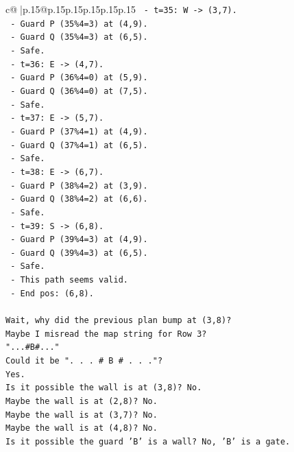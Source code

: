 \documentclass{article}
\begin{document}
{\begin{supertabular}{c@{$\;$}|p{.15\linewidth}@{}p{.15\linewidth}p{.15\linewidth}p{.15\linewidth}p{.15\linewidth}p{.15\linewidth}}
{{{\texttt{  {-} t=35: W {-}> (3,7).} \\
\texttt{    {-} Guard P (35\%4=3) at (4,9).} \\
\texttt{    {-} Guard Q (35\%4=3) at (6,5).} \\
\texttt{    {-} Safe.} \\
\texttt{  {-} t=36: E {-}> (4,7).} \\
\texttt{    {-} Guard P (36\%4=0) at (5,9).} \\
\texttt{    {-} Guard Q (36\%4=0) at (7,5).} \\
\texttt{    {-} Safe.} \\
\texttt{  {-} t=37: E {-}> (5,7).} \\
\texttt{    {-} Guard P (37\%4=1) at (4,9).} \\
\texttt{    {-} Guard Q (37\%4=1) at (6,5).} \\
\texttt{    {-} Safe.} \\
\texttt{  {-} t=38: E {-}> (6,7).} \\
\texttt{    {-} Guard P (38\%4=2) at (3,9).} \\
\texttt{    {-} Guard Q (38\%4=2) at (6,6).} \\
\texttt{    {-} Safe.} \\
\texttt{  {-} t=39: S {-}> (6,8).} \\
\texttt{    {-} Guard P (39\%4=3) at (4,9).} \\
\texttt{    {-} Guard Q (39\%4=3) at (6,5).} \\
\texttt{    {-} Safe.} \\
\texttt{  {-} This path seems valid.} \\
\texttt{  {-} End pos: (6,8).} \\
\\ 
\texttt{Wait, why did the previous plan bump at (3,8)?} \\
\texttt{Maybe I misread the map string for Row 3?} \\
\texttt{"...\#B\#..."} \\
\texttt{Could it be ". . . \# B \# . . ."?} \\
\texttt{Yes.} \\
\texttt{Is it possible the wall is at (3,8)? No.} \\
\texttt{Maybe the wall is at (2,8)? No.} \\
\texttt{Maybe the wall is at (3,7)? No.} \\
\texttt{Maybe the wall is at (4,8)? No.} \\
\texttt{Is it possible the guard 'B' is a wall? No, 'B' is a gate.} \\
}}}
\end{supertabular}}
\end{document}
